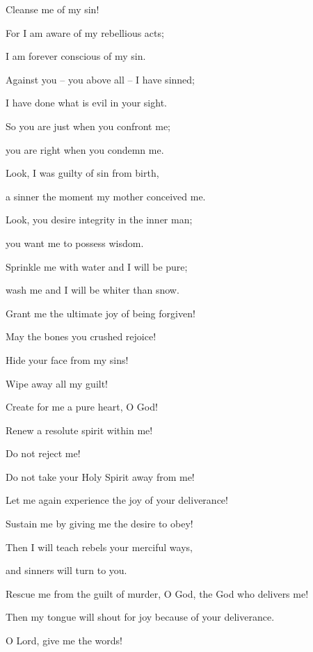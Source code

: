 {\par }{\Q Cleanse
me of my sin!
\par }{\Q {}For
I
am aware
of my rebellious
acts;
\par }{\Q I am forever
conscious of my sin.
\par }{\Q {}Against you – you above all – I have sinned;
\par }{\Q I have done what is evil in your sight.
\par }{\Q So you are just when you confront me;
\par }{\Q you are right when you condemn me.
\par }{\Q {}Look,
I was guilty of sin
from birth,
\par }{\Q a sinner
the moment my mother
conceived me.
\par }{\Q {}Look,
you desire
integrity in the inner man;
\par }{\Q you want me to possess
wisdom.
\par }{\Q {}Sprinkle
me with water
and I will be pure;
\par }{\Q wash
me and I will be whiter
than snow.
\par }{\Q {}Grant
me the ultimate joy
of being forgiven!

\par }{\Q May the bones
you crushed
rejoice!
\par }{\Q {}Hide
your face
from my sins!
\par }{\Q Wipe
away all
my guilt!
\par }{\Q {}Create
for me a pure
heart,
O God!

\par }{\Q Renew
a resolute
spirit
within me!
\par }{\Q {}Do not
reject
me!

\par }{\Q Do not
take
your Holy
Spirit
away from me!
\par }{\Q {}Let me again
experience the joy
of your deliverance!
\par }{\Q Sustain
me by giving me the desire to obey!
\par }{\Q {}Then I will teach
rebels
your merciful ways,
\par }{\Q and sinners
will turn
to you.
\par }{\Q {}Rescue
me from the guilt of murder,
O God,
the God
who delivers
me!
\par }{\Q Then my tongue
will shout
for joy because of your deliverance.
\par }{\Q {}O Lord,
give me the words!

}
